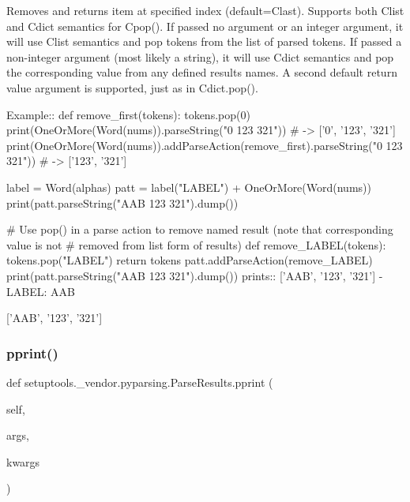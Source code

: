 \begin{DoxyVerb}Removes and returns item at specified index (default=C{last}).
Supports both C{list} and C{dict} semantics for C{pop()}. If passed no
argument or an integer argument, it will use C{list} semantics
and pop tokens from the list of parsed tokens. If passed a 
non-integer argument (most likely a string), it will use C{dict}
semantics and pop the corresponding value from any defined 
results names. A second default return value argument is 
supported, just as in C{dict.pop()}.

Example::
    def remove_first(tokens):
tokens.pop(0)
    print(OneOrMore(Word(nums)).parseString("0 123 321")) # -> ['0', '123', '321']
    print(OneOrMore(Word(nums)).addParseAction(remove_first).parseString("0 123 321")) # -> ['123', '321']

    label = Word(alphas)
    patt = label("LABEL") + OneOrMore(Word(nums))
    print(patt.parseString("AAB 123 321").dump())

    # Use pop() in a parse action to remove named result (note that corresponding value is not
    # removed from list form of results)
    def remove_LABEL(tokens):
tokens.pop("LABEL")
return tokens
    patt.addParseAction(remove_LABEL)
    print(patt.parseString("AAB 123 321").dump())
prints::
    ['AAB', '123', '321']
    - LABEL: AAB

    ['AAB', '123', '321']
\end{DoxyVerb}
 \mbox{\label{classsetuptools_1_1__vendor_1_1pyparsing_1_1ParseResults_a9222a3ef2d28e03e33d1133e56d34f80}} 
\subsubsection{\texorpdfstring{pprint()}{pprint()}}
{\footnotesize\ttfamily def setuptools.\+\_\+vendor.\+pyparsing.\+Parse\+Results.\+pprint (\begin{DoxyParamCaption}\item[{}]{self,  }\item[{}]{args,  }\item[{}]{kwargs }\end{DoxyParamCaption})}

